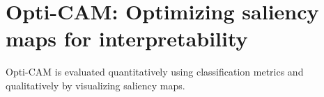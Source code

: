 \chapter{Opti-CAM: Optimizing saliency maps for interpretability}
\chaptertoc{}
\label{ch:opticam}



Opti-CAM is evaluated quantitatively using classification metrics and qualitatively by visualizing
 saliency maps.




